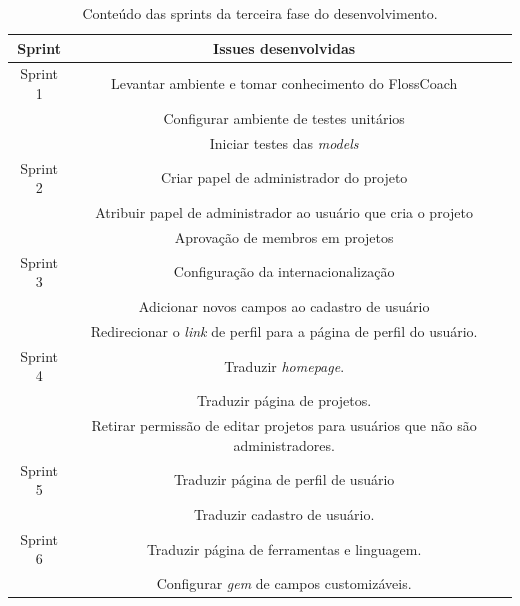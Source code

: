 \begin{table}[h]
	\centering
	\begin{tabular}{ccc}
		\toprule
		\textbf{Sprint} & \textbf{Issues desenvolvidas} \\
		\midrule
		Sprint 1 & Levantar ambiente e tomar conhecimento do FlossCoach \\
			 & Configurar ambiente de testes unitários \\
			 & Iniciar testes das \textit{models}\\
		\midrule
		Sprint 2 & Criar papel de administrador do projeto\\
			 & Atribuir papel de administrador ao usuário que cria o projeto \\
			 & Aprovação de membros em projetos \\
		\midrule		
		Sprint 3 & Configuração da internacionalização \\
			 & Adicionar novos campos ao cadastro de usuário\\
			 & Redirecionar o \textit{link} de perfil para a página de perfil do usuário.\\
		\midrule		
		Sprint 4 & Traduzir \textit{homepage}.\\
			 & Traduzir página de projetos.\\
			 & Retirar permissão de editar projetos para usuários que não são administradores.\\ 
		\midrule		
		Sprint 5 & Traduzir página de perfil de usuário\\
			 & Traduzir cadastro de usuário.\\
		\midrule
		Sprint 6 & Traduzir página de ferramentas e linguagem.\\
			 & Configurar \textit{gem} de campos customizáveis.\\
		\bottomrule
	\end{tabular}

	\caption{Conteúdo das sprints da terceira fase do desenvolvimento.}
	\label{issues}
\end{table}


